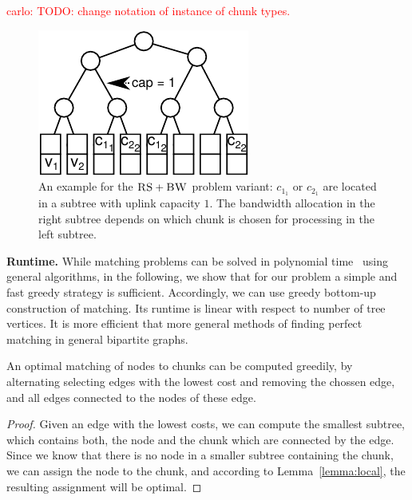 \documentclass[9pt]{sigcomm-alternate}
\newcommand{\carlo}[1]{\textcolor{red}{carlo: #1}}
\newcommand{\achunk}{\ensuremath{c}}
\newcommand{\RS}{\textsc{RS}}
\newcommand{\BW}{\textsc{BW}}
\begin{document}
\carlo{TODO: change notation of instance of chunk types.}

\begin{figure}
 \includegraphics[width = \columnwidth]{figs/matching_no_rs}
 \caption{An example for the $\RS+\BW$ problem variant: $\achunk_{1_1}$ or $\achunk_{2_1}$ are
located in a subtree with uplink capacity $1$. The bandwidth allocation in the right
subtree depends on which chunk is chosen for processing in the left
subtree.}
 \label{fig:matching_no_rs}
\end{figure}


\textbf{Runtime.} While matching problems can be solved in polynomial 
time~\cite{schrijver_combinatorial_optimization} using
general algorithms, in the following, we show that for our problem
a simple and fast greedy strategy is sufficient.
Accordingly, we can use greedy bottom-up construction of matching.
Its runtime is linear with respect to number of tree vertices. It is more 
efficient that more general methods of
finding perfect matching in general bipartite graphs.

\begin{corollary}
An optimal matching of nodes to chunks can be computed greedily, by 
alternating selecting edges with the lowest cost and removing the chossen 
edge, and all edges connected to the nodes of these edge.
\end{corollary}

\begin{proof}
Given an edge with the lowest costs, we can compute the smallest subtree, which 
contains both, the node and the chunk which are connected by the edge. Since we 
know that there is no node in a smaller subtree containing the chunk, we can 
assign the node to the chunk, and according to Lemma~\ref{lemma:local}, the 
resulting assignment will be optimal.
\end{proof}
\end{document}
